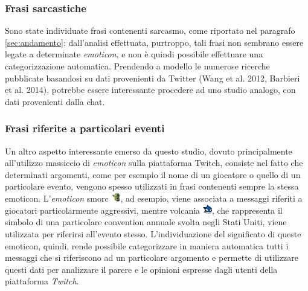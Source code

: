 \documentclass[a4paper,12pt,openright,twoside]{report}
\theoremstyle{definition}
\begin{document}
\subsubsection{Frasi sarcastiche}
Sono state individuate frasi contenenti sarcasmo, come riportato nel paragrafo \ref{sec:andamento}: 
dall'analisi effettuata, purtroppo, tali frasi non sembrano essere
legate a determinate \emph{emoticon}, e non è quindi possibile
effettuare una categorizzazione automatica.
Prendendo a modello le numerose ricerche pubblicate basandosi su dati provenienti da Twitter
(Wang et al. 2012, Barbieri et al. 2014), %
potrebbe essere interessante procedere ad uno studio analogo, con dati provenienti dalla chat.

\subsubsection{Frasi riferite a particolari eventi}
Un altro aspetto interessante emerso da questo studio, dovuto principalmente all'utilizzo massiccio di \emph{emoticon} sulla
piattaforma Twitch, 
consiste nel fatto che determinati argomenti, come per esempio il nome di un giocatore o 
quello di un particolare evento,
vengono spesso utilizzati in frasi contenenti sempre la stessa emoticon. 
L'\emph{emoticon} smorc \includegraphics[height=0.4cm, width=0.4cm]{Immagini/Emoticons/smorc.png}, ad esempio, 
viene associata a messaggi
riferiti a giocatori
particolarmente aggressivi, mentre volcania \includegraphics[height=0.4cm, width=0.4cm]{Immagini/Emoticons/volcania.png}, che rappresenta il simbolo di una particolare convention annuale svolta negli Stati Uniti,
viene utilizzata per riferirsi all'evento stesso.
L’individuazione del significato di queste emoticon, quindi, rende possibile categorizzare in maniera
automatica tutti i messaggi che si riferiscono ad un particolare argomento
e permette di utilizzare 
questi dati per analizzare il parere e le opinioni espresse dagli utenti della piattaforma \emph{Twitch}.
\end{document}
